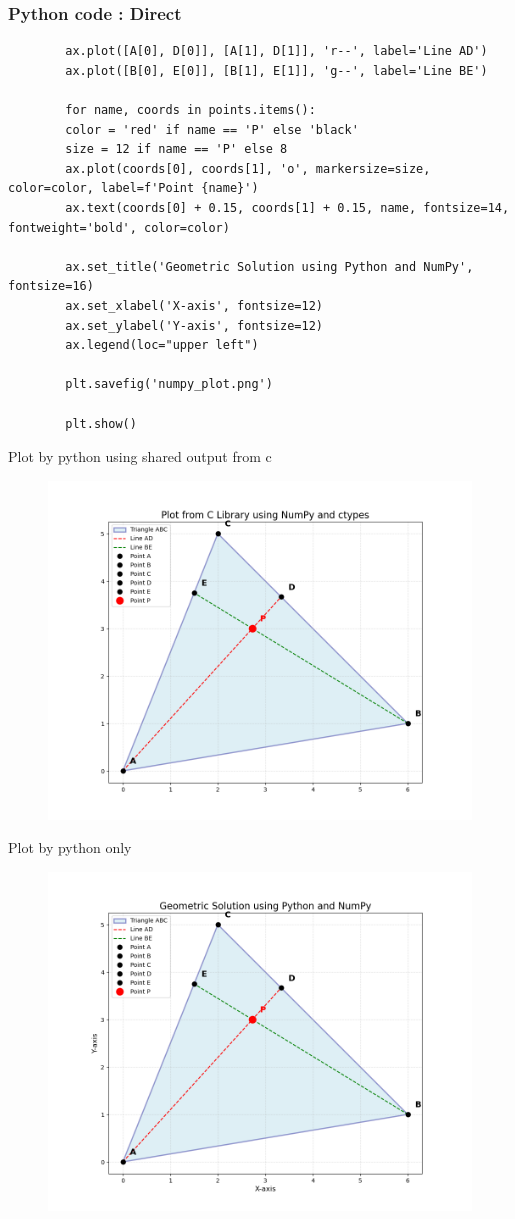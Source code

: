 \documentclass{beamer}
\begin{document}
	\begin{frame}[fragile]
		\frametitle{Python code : Direct }
		
		\begin{lstlisting}
		ax.plot([A[0], D[0]], [A[1], D[1]], 'r--', label='Line AD')
		ax.plot([B[0], E[0]], [B[1], E[1]], 'g--', label='Line BE')
		
		for name, coords in points.items():
		color = 'red' if name == 'P' else 'black'
		size = 12 if name == 'P' else 8
		ax.plot(coords[0], coords[1], 'o', markersize=size, color=color, label=f'Point {name}')
		ax.text(coords[0] + 0.15, coords[1] + 0.15, name, fontsize=14, fontweight='bold', color=color)
		
		ax.set_title('Geometric Solution using Python and NumPy', fontsize=16)
		ax.set_xlabel('X-axis', fontsize=12)
		ax.set_ylabel('Y-axis', fontsize=12)
		ax.legend(loc="upper left")
		
		plt.savefig('numpy_plot.png')
		
		plt.show()
		\end{lstlisting}
	\end{frame}
	
	
	\begin{frame}{Plot by python using shared output from c}
		\begin{figure}[H]
			\centering
			\includegraphics[width = 0.6\columnwidth]{figs/Figure_1.png}
			\caption*{}
			\label{fig1}
		\end{figure}
	\end{frame}
	
	\begin{frame}{Plot by python only}
		\begin{figure}[H]
			\centering
			\includegraphics[width = 0.6\columnwidth]{figs/Figure_2.png}
			\caption*{}
			\label{fig2}
		\end{figure}
	\end{frame}
	
	
	
\end{document}
